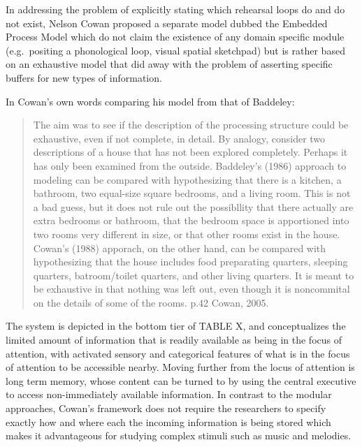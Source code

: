 \documentclass[]{book}
\theoremstyle{definition}
\theoremstyle{definition}
\theoremstyle{definition}
\theoremstyle{remark}
\begin{document}
In addressing the problem of explicitly stating which rehearsal loops do
and do not exist, Nelson Cowan proposed a separate model
\citep{cowanEvolvingConceptionsMemory1988, cowanWorkingMemoryCapacity2005}
dubbed the Embedded Process Model which do not claim the existence of
any domain specific module (e.g.~positing a phonological loop, visual
spatial sketchpad) but is rather based on an exhaustive model that did
away with the problem of asserting specific buffers for new types of
information.

In Cowan's own words comparing his model from that of Baddeley:

\begin{quote}
The aim was to see if the description of the processing structure could
be exhaustive, even if not complete, in detail. By analogy, consider two
descriptions of a house that has not been explored completely. Perhaps
it has only been examined from the outside. Baddeley's (1986) approach
to modeling can be compared with hypothesizing that there is a kitchen,
a bathroom, two equal-size square bedrooms, and a living room. This is
not a bad guess, but it does not rule out the possibllity that there
actually are extra bedrooms or bathroom, that the bedroom space is
apportioned into two rooms very different in size, or that other rooms
exist in the house. Cowan's (1988) apporach, on the other hand, can be
compared with hypothesizing that the house includes food preparating
quarters, sleeping quarters, batroom/toilet quarters, and other living
quarters. It is meant to be exhaustive in that nothing was left out,
even though it is noncommital on the details of some of the rooms. p.42
Cowan, 2005.
\end{quote}

The system is depicted in the bottom tier of TABLE X, and conceptualizes
the limited amount of information that is readily available as being in
the focus of attention, with activated sensory and categorical features
of what is in the focus of attention to be accessible nearby. Moving
further from the locus of attention is long term memory, whose content
can be turned to by using the central executive to access
non-immediately available information. In contrast to the modular
approaches, Cowan's framework does not require the researchers to
specify exactly how and where each the incoming information is being
stored which makes it advantageous for studying complex stimuli such as
music and melodies.
\end{document}
